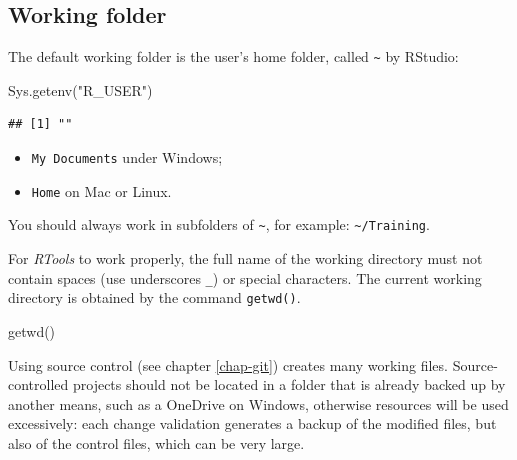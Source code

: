 \documentclass[
  12pt,
  american,
  a4paper,
  extrafontsizes,onecolumn,openright
  ]{memoir}
\newenvironment{Shaded}{\begin{snugshade}}{\end{snugshade}}
\newcommand{\FunctionTok}[1]{\textcolor[rgb]{0.00,0.00,0.00}{#1}}
\newcommand{\NormalTok}[1]{#1}
\newcommand{\StringTok}[1]{\textcolor[rgb]{0.31,0.60,0.02}{#1}}
\providecommand{\tightlist}{%
  \setlength{\itemsep}{0pt}\setlength{\parskip}{0pt}}
\begin{document}
\hypertarget{working-folder}{%
\subsection{Working folder}\label{working-folder}}

The default working folder is the user's home folder, called \texttt{\textasciitilde{}} by RStudio:

\scriptsize

\begin{Shaded}
\begin{Highlighting}[]
\FunctionTok{Sys.getenv}\NormalTok{(}\StringTok{"R\_USER"}\NormalTok{)}
\end{Highlighting}
\end{Shaded}

\begin{verbatim}
## [1] ""
\end{verbatim}

\normalsize

\begin{itemize}
\tightlist
\item
  \texttt{My\ Documents} under Windows;
\item
  \texttt{Home} on Mac or Linux.
\end{itemize}

You should always work in subfolders of \texttt{\textasciitilde{}}, for example: \texttt{\textasciitilde{}/Training}.

For \emph{RTools} to work properly, the full name of the working directory must not contain spaces (use underscores \texttt{\_}) or special characters.
The current working directory is obtained by the command \texttt{getwd()}.

\scriptsize

\begin{Shaded}
\begin{Highlighting}[]
\FunctionTok{getwd}\NormalTok{()}
\end{Highlighting}
\end{Shaded}

\normalsize

Using source control (see chapter \ref{chap-git}) creates many working files.
Source-controlled projects should not be located in a folder that is already backed up by another means, such as a OneDrive on Windows, otherwise resources will be used excessively: each change validation generates a backup of the modified files, but also of the control files, which can be very large.
\end{document}
